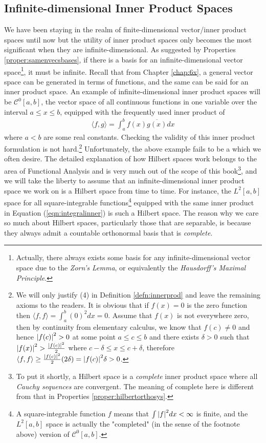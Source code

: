 \subsection{Infinite-dimensional Inner Product Spaces}
\label{section:infinner}

We have been staying in the realm of finite-dimensional vector/inner product spaces until now but the utility of inner product spaces only becomes the most significant when they are infinite-dimensional. As suggested by Properties \ref{proper:samenvecsbases}, if there is a basis for an infinite-dimensional vector space\footnote{Actually, there always exists some basis for any infinite-dimensional vector space due to the \textit{Zorn's Lemma}, or equivalently the \textit{Hausdorff's Maximal Principle}.}, it must be infinite. Recall that from Chapter \ref{chap:6x}, a general vector space can be generated in terms of functions, and the same can be said for an inner product space. An example of infinite-dimensional inner product spaces will be $\mathcal{C}^0[a,b]$, the vector space of all continuous functions in one variable over the interval $a \leq x \leq b$, equipped with the frequently used inner product of
\begin{align}
\langle f,g \rangle = \int_a^b f(x) \overline{g(x)} dx \label{eqn:integralinner}
\end{align}
where $a < b$ are some real constants. Checking the validity of this inner product formulation is not hard.\footnote{We will only justify (4) in Definition \ref{defn:innerprod} and leave the remaining axioms to the readers. It is obvious that if $f(x) = 0$ is the zero function then $\langle f,f \rangle = \int_a^b (0)^2 dx = 0$. Assume that $f(x)$ is not everywhere zero, then by continuity from elementary calculus, we know that $f(c) \neq 0$ and hence $\abs{f(c)}^2 > 0$ at some point $a \leq c \leq b$ and there exists $\delta > 0$ such that $\abs{f(x)}^2 > \frac{\abs{f(c)}^2}{2}$ where $c-\delta \leq x \leq c+\delta$, therefore $\langle f,f \rangle \geq \frac{\abs{f(c)}^2}{2} (2\delta) = \abs{f(c)}^2 \delta > 0$.} 
Unfortunately, the above example fails to be a  which we often desire. The detailed explanation of how Hilbert spaces work belongs to the area of Functional Analysis and is very much out of the scope of this book\footnote{To put it shortly, a Hilbert space is a \textit{complete} inner product space where all \textit{Cauchy sequences} are convergent. The meaning of complete here is different from that in Properties \ref{proper:hilbertorthosys}.}, and we will take the liberty to assume that an infinite-dimensional inner product space we work on is a  Hilbert space from time to time. For instance, the $L^2[a,b]$ space for all square-integrable functions\footnote{A square-integrable function $f$ means that $\int \abs{f}^2 dx < \infty$ is finite, and the $L^2[a,b]$ space is actually the "completed" (in the sense of the footnote above) version of $\mathcal{C}^0[a,b]$.} equipped with the same inner product in Equation (\ref{eqn:integralinner}) is such a Hilbert space. The reason why we care so much about Hilbert spaces, particularly those that are separable, is because they always admit a countable orthonormal basis that is \textit{complete}.
